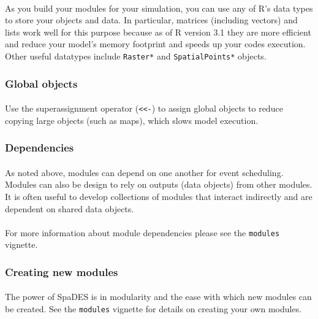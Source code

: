 \documentclass{article}
\begin{document}
\paragraph{}
As you build your modules for your simulation, you can use any of \textsf{R}'s data types to store your objects and data. In particular, matrices (including vectors) and lists work well for this purpose because as of \textsf{R} version 3.1 they are more efficient and reduce your model's memory footprint and speeds up your codes execution. Other useful datatypes include \texttt{Raster*} and \texttt{SpatialPoints*} objects.

\subsubsection{Global objects}

\paragraph{}
Use the superassignment operator (\texttt{<}\texttt{<-}) to assign global objects to reduce copying large objects (such as maps), which slows model execution.

\subsubsection{Dependencies}

\paragraph{}
As noted above, modules can depend on one another for event scheduling. Modules can also be design to rely on outputs (data objects) from other modules. It is often useful to develop collections of modules that interact indirectly and are dependent on shared data objects.

\paragraph{}
For more information about module dependencies please see the \texttt{modules} vignette.

\subsubsection{Creating new modules}

\paragraph{}
The power of SpaDES is in modularity and the ease with which new modules can be created. See the \texttt{modules} vignette for details on creating your own modules.
\end{document}
